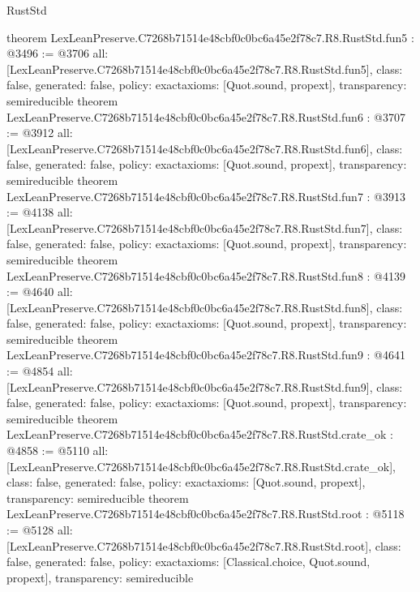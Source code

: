\begin{lexlean}{RustStd}
\begin{coremodule}
{}
theorem LexLeanPreserve.C7268b71514e48cbf0c0bc6a45e2f78c7.R8.RustStd.fun5 : @3496 := @3706 {
  all: [LexLeanPreserve.C7268b71514e48cbf0c0bc6a45e2f78c7.R8.RustStd.fun5],
  class: false,
  generated: false,
  policy: exact{axioms: [Quot.sound, propext]},
  transparency: semireducible
}
theorem LexLeanPreserve.C7268b71514e48cbf0c0bc6a45e2f78c7.R8.RustStd.fun6 : @3707 := @3912 {
  all: [LexLeanPreserve.C7268b71514e48cbf0c0bc6a45e2f78c7.R8.RustStd.fun6],
  class: false,
  generated: false,
  policy: exact{axioms: [Quot.sound, propext]},
  transparency: semireducible
}
theorem LexLeanPreserve.C7268b71514e48cbf0c0bc6a45e2f78c7.R8.RustStd.fun7 : @3913 := @4138 {
  all: [LexLeanPreserve.C7268b71514e48cbf0c0bc6a45e2f78c7.R8.RustStd.fun7],
  class: false,
  generated: false,
  policy: exact{axioms: [Quot.sound, propext]},
  transparency: semireducible
}
theorem LexLeanPreserve.C7268b71514e48cbf0c0bc6a45e2f78c7.R8.RustStd.fun8 : @4139 := @4640 {
  all: [LexLeanPreserve.C7268b71514e48cbf0c0bc6a45e2f78c7.R8.RustStd.fun8],
  class: false,
  generated: false,
  policy: exact{axioms: [Quot.sound, propext]},
  transparency: semireducible
}
theorem LexLeanPreserve.C7268b71514e48cbf0c0bc6a45e2f78c7.R8.RustStd.fun9 : @4641 := @4854 {
  all: [LexLeanPreserve.C7268b71514e48cbf0c0bc6a45e2f78c7.R8.RustStd.fun9],
  class: false,
  generated: false,
  policy: exact{axioms: [Quot.sound, propext]},
  transparency: semireducible
}
theorem LexLeanPreserve.C7268b71514e48cbf0c0bc6a45e2f78c7.R8.RustStd.crate_ok : @4858 := @5110 {
  all: [LexLeanPreserve.C7268b71514e48cbf0c0bc6a45e2f78c7.R8.RustStd.crate_ok],
  class: false,
  generated: false,
  policy: exact{axioms: [Quot.sound, propext]},
  transparency: semireducible
}
theorem LexLeanPreserve.C7268b71514e48cbf0c0bc6a45e2f78c7.R8.RustStd.root : @5118 := @5128 {
  all: [LexLeanPreserve.C7268b71514e48cbf0c0bc6a45e2f78c7.R8.RustStd.root],
  class: false,
  generated: false,
  policy: exact{axioms: [Classical.choice, Quot.sound, propext]},
  transparency: semireducible
}


\end{coremodule}
\end{lexlean}
